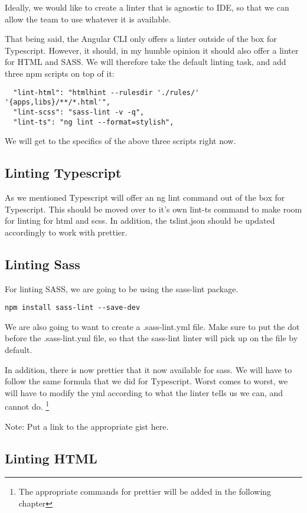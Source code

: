Ideally, we would like to create a linter that is agnostic to IDE, so that we
can allow the team to use whatever it is available.

That being said, the Angular CLI only offers a linter outside of the box for
Typescript. However, it should, in my humble opinion it should also offer a
linter for HTML and SASS. We will therefore take the default linting task, and
add three npm scripts on top of it:

\begin{verbatim}
  "lint-html": "htmlhint --rulesdir './rules/' '{apps,libs}/**/*.html'",
  "lint-scss": "sass-lint -v -q",
  "lint-ts": "ng lint --format=stylish",
\end{verbatim}

We will get to the specifics of the above three scripts right now.

\subsection{ Linting Typescript }
As we mentioned Typescript will offer an ng lint command out of the box for
Typescript. This should be moved over to it's own lint-ts command to make room
for linting for html and scss. In addition, the tslint.json should be updated
accordingly to work with prettier.

\subsection{ Linting Sass }
For linting SASS, we are going to be using the sass-lint package.
\begin{lstlisting}
npm install sass-lint --save-dev
\end{lstlisting}

We are also going to want to create a .sass-lint.yml file. Make sure to put the
dot before the .sass-lint.yml file, so that the sass-lint linter will pick up
on the file by default.

In addition, there is now prettier that it now available for sass. We will have
to follow the same formula that we did for Typescript. Worst comes to worst, we
will have to modify the yml according to what the linter tells us we can, and
cannot do. \footnote{The appropriate commands for prettier will be added in the
following chapter}

Note: Put a link to the appropriate gist here.

\subsection{ Linting HTML }

